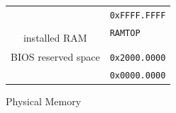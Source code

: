 \documentclass[12pt,a4paper,openright,twoside]{report}
\begin{document}
\begin{figure}[ht]
	\centering
	\renewcommand{\arraystretch}{0.755}
	\begin{tabular}{cl}
		                                                           & \multirow{2}{*}{\texttt{0xFFFF.FFFF}} \\ \hhline{-~}
		\multicolumn{1}{|c|}{\multirow{2}{*}{\cellcolor{gray}}}    &                                       \\ [-1ex]
		\multicolumn{1}{|c|}{\cellcolor{gray}}                     & \multirow{2}{*}{\texttt{RAMTOP}}      \\ \cline{1-1}
		\multicolumn{1}{|c|}{\multirow{4}{*}{installed RAM}}       &                                       \\
		\multicolumn{1}{|c|}{}                                     &                                       \\
		\multicolumn{1}{|c|}{}                                     &                                       \\
		\multicolumn{1}{|c|}{}                                     & \multirow{2}{*}{\texttt{0x2000.0000}} \\ \cline{1-1}
		\multicolumn{1}{|c|}{\multirow{2}{*}{BIOS reserved space}} &                                       \\
		\multicolumn{1}{|c|}{}                                     & \multirow{2}{*}{\texttt{0x0000.0000}} \\ \cline{1-1}
		\multicolumn{1}{l}{}                                       &
	\end{tabular}
	\caption{Physical Memory}
	\label{fig:physical_memory}
\end{figure}
\end{document}
